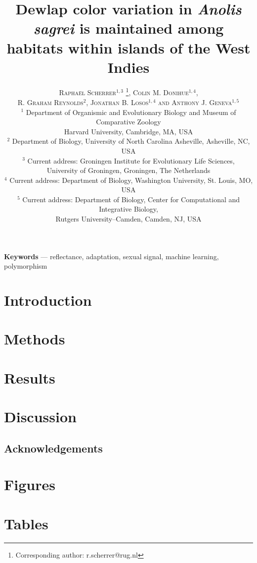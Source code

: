 \documentclass{article}
\title{Dewlap color variation in \textit{Anolis sagrei} is maintained among habitats within islands of the West Indies}
\author{
    \textsc{Rapha\"{e}l Scherrer$^{1,3}$ \thanks{Corresponding author: r.scherrer@rug.nl}, Colin M. Donihue$^{1,4}$, }\\
	\textsc{R. Graham Reynolds$^2$, Jonathan B. Losos$^{1,4}$ and Anthony J. Geneva$^{1,5}$} \\[1ex]
	\normalsize $^1$ Department of Organismic and Evolutionary Biology and Museum of Comparative Zoology \\ \normalsize Harvard University, Cambridge, MA, USA \\
	\normalsize $^2$ Department of Biology, University of North Carolina Asheville, Asheville, NC, USA\\ 
	\normalsize $^3$ Current address: Groningen Institute for Evolutionary Life Sciences,\\
	\normalsize University of Groningen, Groningen, The Netherlands\\
	\normalsize $^4$ Current address: Department of Biology, Washington University, St. Louis, MO, USA\\
	\normalsize $^5$ Current address: Department of Biology, Center for Computational and Integrative Biology,\\ \normalsize Rutgers University--Camden, Camden, NJ, USA
}
\date{} %
\begin{document}
	
\linenumbers
	
\maketitle

\begin{abstract}
    
\end{abstract}

\textbf{Keywords} --- reflectance, adaptation, sexual signal, machine learning, polymorphism

\section*{Introduction}
	

	
\section*{Methods}


	
\section*{Results}



\section*{Discussion}


	
\subsection*{Acknowledgements}


	
\pagebreak

\section*{Figures}



\pagebreak

\section*{Tables}
\end{document}
